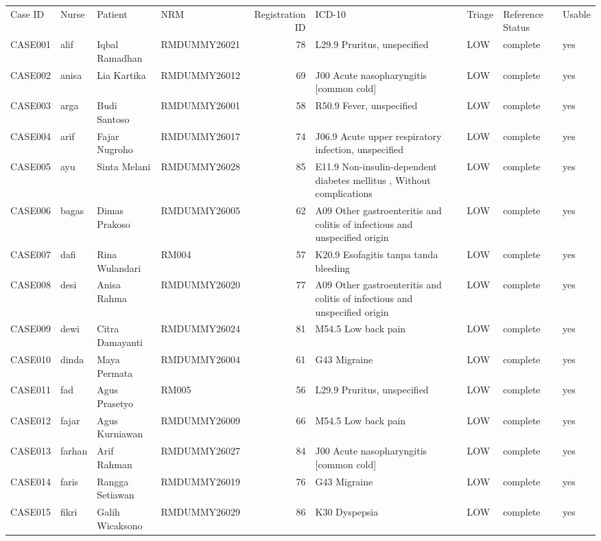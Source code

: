 \begin{table}[htbp]
\centering
\small
\begin{tabular}{l l l l r l l l l}
\hline
Case ID & Nurse & Patient & NRM & Registration ID & ICD-10 & Triage & Reference Status & Usable \\\n\hline
CASE001 & alif & Iqbal Ramadhan & RMDUMMY26021 & 78 & L29.9 Pruritus, unspecified & LOW & complete & yes \\
CASE002 & anisa & Lia Kartika & RMDUMMY26012 & 69 & J00 Acute nasopharyngitis [common cold] & LOW & complete & yes \\
CASE003 & arga & Budi Santoso & RMDUMMY26001 & 58 & R50.9 Fever, unspecified & LOW & complete & yes \\
CASE004 & arif & Fajar Nugroho & RMDUMMY26017 & 74 & J06.9 Acute upper respiratory infection, unspecified & LOW & complete & yes \\
CASE005 & ayu & Sinta Melani & RMDUMMY26028 & 85 & E11.9 Non-insulin-dependent diabetes mellitus ,  Without complications & LOW & complete & yes \\
CASE006 & bagas & Dimas Prakoso & RMDUMMY26005 & 62 & A09 Other gastroenteritis and colitis of infectious and unspecified origin & LOW & complete & yes \\
CASE007 & dafi & Rina Wulandari & RM004 & 57 & K20.9 Esofagitis tanpa tanda bleeding & LOW & complete & yes \\
CASE008 & desi & Anisa Rahma & RMDUMMY26020 & 77 & A09 Other gastroenteritis and colitis of infectious and unspecified origin & LOW & complete & yes \\
CASE009 & dewi & Citra Damayanti & RMDUMMY26024 & 81 & M54.5 Low back pain & LOW & complete & yes \\
CASE010 & dinda & Maya Permata & RMDUMMY26004 & 61 & G43 Migraine & LOW & complete & yes \\
CASE011 & fad & Agus Prasetyo & RM005 & 56 & L29.9 Pruritus, unspecified & LOW & complete & yes \\
CASE012 & fajar & Agus Kurniawan & RMDUMMY26009 & 66 & M54.5 Low back pain & LOW & complete & yes \\
CASE013 & farhan & Arif Rahman & RMDUMMY26027 & 84 & J00 Acute nasopharyngitis [common cold] & LOW & complete & yes \\
CASE014 & faris & Rangga Setiawan & RMDUMMY26019 & 76 & G43 Migraine & LOW & complete & yes \\
CASE015 & fikri & Galih Wicaksono & RMDUMMY26029 & 86 & K30 Dyspepsia & LOW & complete & yes \\

\end{tabular}
\end{table}
